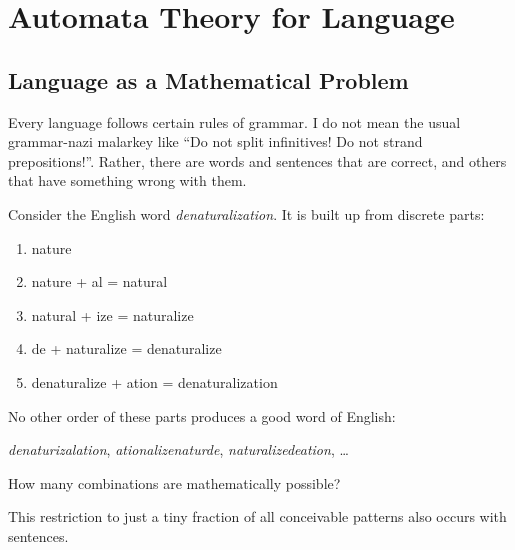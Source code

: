 \chapter*{\texorpdfstring{\color{brown!95}Automata Theory for Language}{Automata Theory for Language}}
\label{cha:fsa}


\section{Language as a Mathematical Problem}

Every language follows certain rules of grammar.
I do not mean the usual grammar-nazi malarkey like ``Do not split infinitives! Do not strand prepositions!''.
Rather, there are words and sentences that are correct, and others that have something wrong with them.

\begin{examplebox}
    Consider the English word \emph{denaturalization}.
    It is built up from discrete parts:
    \begin{enumerate}
        \item nature
        \item nature + al = natural
        \item natural + ize = naturalize
        \item de + naturalize = denaturalize
        \item denaturalize + ation = denaturalization
    \end{enumerate}
    No other order of these parts produces a good word of English:
    
    \smallskip
    \noindent
    \emph{denaturizalation}, \emph{ationalizenaturde}, \emph{naturalizedeation}, \ldots
\end{examplebox}
%
\begin{homework}
    How many combinations are mathematically possible?
\end{homework}
%
This restriction to just a tiny fraction of all conceivable patterns also occurs with sentences.

